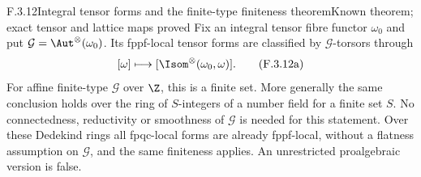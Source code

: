 \begin{result}{F.3.12}{Integral tensor forms and the finite-type finiteness theorem}{Known theorem; exact tensor and lattice maps proved}
Fix an integral tensor fibre functor $\omega_0$ and put
$\mathcal G=\Aut^\otimes(\omega_0)$. Its fppf-local tensor
forms are classified by $\mathcal G$-torsors through
\[
 [\omega]\longmapsto
       [\Isom^\otimes(\omega_0,\omega)].
 \tag{F.3.12a}
\]
For affine finite-type $\mathcal G$ over $\Z$, this is a finite
set. More generally the same conclusion holds over the ring
of $S$-integers of a number field for a finite set $S$.
No connectedness,
reductivity or smoothness of $\mathcal G$ is needed for this
statement. Over these Dedekind rings all fpqc-local forms
are already fppf-local, without a flatness assumption on
$\mathcal G$, and the same finiteness applies. An
unrestricted proalgebraic version is false.
\end{result}
